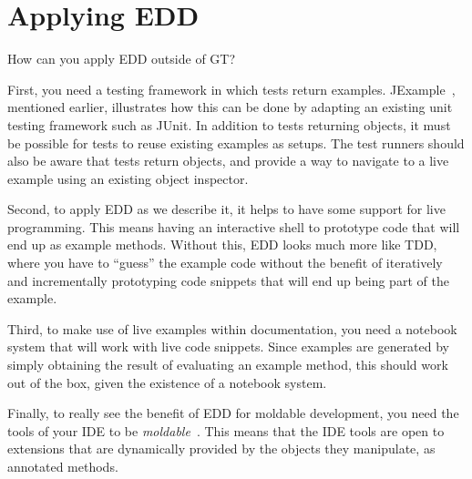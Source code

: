 \documentclass[acmsmall,screen,authorversion,nonacm]{acmart} %
\begin{document}

\section{Applying EDD}\label{sec:applying}


How can you apply EDD outside of GT?

First, you need a testing framework in which tests return examples.
JExample~\cite{Kuhn08a}, mentioned earlier, illustrates how this can be done by adapting an existing unit testing framework such as JUnit.
In addition to tests returning objects, it must be possible for tests to reuse existing examples as setups.
The test runners should also be aware that tests return objects, and provide a way to navigate to a live example using an existing object inspector.

Second, to apply EDD as we describe it, it helps to have some support for live programming.
This means having an interactive shell to prototype code that will end up as example methods.
Without this, EDD looks much more like TDD, where you have to ``guess'' the example code without the benefit of iteratively and incrementally prototyping code snippets that will end up being part of the example.

Third, to make use of live examples within documentation, you need a notebook system that will work with live code snippets.
Since examples are generated by simply obtaining the result of evaluating an example method, this should work out of the box, given the existence of a notebook system.

Finally, to really see the benefit of EDD for moldable development, you need the tools of your IDE to be \emph{moldable}~\cite{Chis17a}.
This means that the IDE tools are open to extensions that are dynamically provided by the objects they manipulate, \eg as annotated methods.
\end{document}
